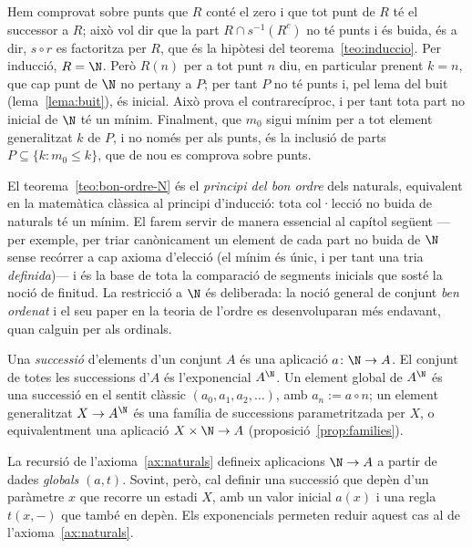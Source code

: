 \begin{prova}
Hem comprovat sobre punts que \(R\) conté el zero i que tot punt de \(R\)
té el successor a \(R\); això vol dir que la part \(R\cap s^{-1}(R^c)\)
no té punts i és buida, és a dir, \(s\circ r\) es factoritza per \(R\),
que és la hipòtesi del teorema~\ref{teo:induccio}. Per inducció,
\(R=\N\). Però \(R(n)\) per a tot punt \(n\) diu, en particular prenent
\(k=n\), que cap punt de \(\N\) no pertany a \(P\); per tant \(P\) no té
punts i, pel lema del buit (lema~\ref{lema:buit}), és inicial. Això prova
el contrarecíproc, i per tant tota part no inicial de \(\N\) té un mínim.
Finalment, que \(m_0\) sigui mínim per a tot element generalitzat \(k\) de
\(P\), i no només per als punts, és la inclusió de parts
\(P\subseteq\{k:m_0\le k\}\), que de nou es comprova sobre punts.
\end{prova}

\begin{observacio}\label{obs:bon-ordre-classica}
El teorema~\ref{teo:bon-ordre-N} és el \emph{principi del bon ordre} dels
naturals, equivalent en la matemàtica clàssica al principi d'inducció: tota
col·lecció no buida de naturals té un mínim. El farem servir de manera
essencial al capítol següent ---per exemple, per triar canònicament un
element de cada part no buida de \(\N\) sense recórrer a cap axioma
d'elecció (el mínim és únic, i per tant una tria \emph{definida})--- i és
la base de tota la comparació de segments inicials que sosté la noció de
finitud. La restricció a \(\N\) és deliberada: la noció general de conjunt
\emph{ben ordenat} i el seu paper en la teoria de l'ordre es
desenvoluparan més endavant, quan calguin per als ordinals.
\end{observacio}

\begin{definicio}[Successió]\label{def:successio}
Una \emph{successió} d'elements d'un conjunt \(A\) és una aplicació
\(a\colon\N\to A\). El conjunt de totes les successions d'\(A\) és
l'exponencial \(A^{\N}\). Un element global de \(A^{\N}\) és una successió
en el sentit clàssic \((a_0,a_1,a_2,\dots)\), amb \(a_n:=a\circ n\); un
element generalitzat \(X\to A^{\N}\) és una família de successions
parametritzada per \(X\), o equivalentment una aplicació
\(X\times\N\to A\) (proposició~\ref{prop:families}).
\end{definicio}

La recursió de l'axioma~\ref{ax:naturals} defineix aplicacions
\(\N\to A\) a partir de dades \emph{globals} \((a,t)\). Sovint, però, cal
definir una successió que depèn d'un paràmetre \(x\) que recorre un estadi
\(X\), amb un valor inicial \(a(x)\) i una regla \(t(x,-)\) que també en
depèn. Els exponencials permeten reduir aquest cas al de
l'axioma~\ref{ax:naturals}.

